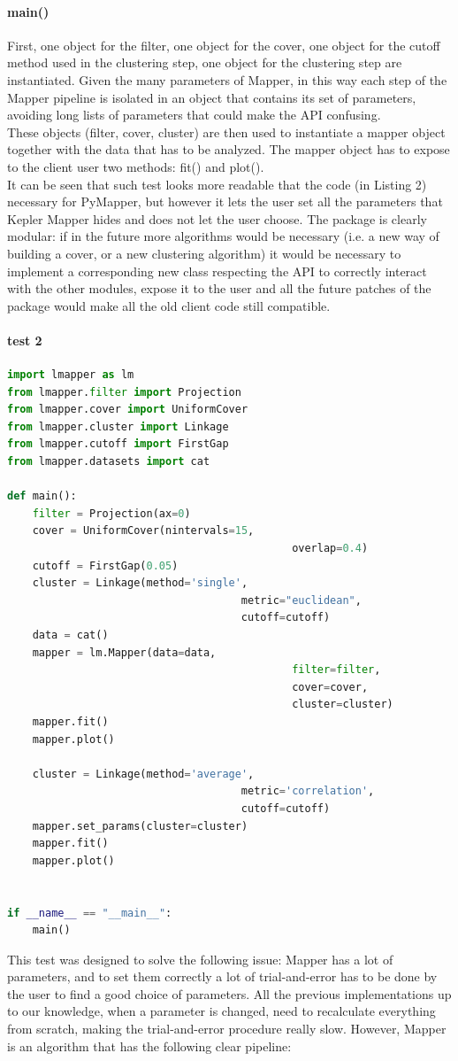 \paragraph{main()}
First, one object for the filter, one object for the cover, one object for the cutoff method used in the clustering step, one object for the clustering step are instantiated. Given the many parameters of Mapper, in this way each step of the Mapper pipeline is isolated in an object that contains its set of parameters, avoiding long lists of parameters that could make the API confusing.\\
These objects (filter, cover, cluster) are then used to instantiate a mapper object together with the data that has to be analyzed. The mapper object has to expose to the client user two methods: fit() and plot().\\
It can be seen that such test looks more readable that the code (in Listing 2) necessary for PyMapper, but however it lets the user set all the parameters that Kepler Mapper hides and does not let the user choose. The package is clearly modular: if in the future more algorithms would be necessary (i.e. a new way of building a cover, or a new clustering algorithm) it would be necessary to implement a corresponding new class respecting the API to correctly interact with the other modules, expose it to the user and all the future patches of the package would make all the old client code still compatible.\\

\paragraph{test 2}
\begin{lstlisting}[language=Python, caption=Second test for Mapper]
import lmapper as lm
from lmapper.filter import Projection
from lmapper.cover import UniformCover
from lmapper.cluster import Linkage
from lmapper.cutoff import FirstGap
from lmapper.datasets import cat

def main():
	filter = Projection(ax=0)
	cover = UniformCover(nintervals=15,
											 overlap=0.4)
	cutoff = FirstGap(0.05)
 	cluster = Linkage(method='single',
									 metric="euclidean",
									 cutoff=cutoff)
	data = cat()
	mapper = lm.Mapper(data=data,
											 filter=filter,
											 cover=cover,
											 cluster=cluster)
	mapper.fit()
	mapper.plot()
	
	cluster = Linkage(method='average',
									 metric='correlation',
									 cutoff=cutoff)
	mapper.set_params(cluster=cluster)
	mapper.fit()
	mapper.plot()


if __name__ == "__main__":
	main()

\end{lstlisting}
This test was designed to solve the following issue: Mapper has a lot of parameters, and to set them correctly a lot of trial-and-error has to be done by the user to find a good choice of parameters. All the previous implementations up to our knowledge, when a parameter is changed, need to recalculate everything from scratch, making the trial-and-error procedure really slow. However, Mapper is an algorithm that has the following clear pipeline:

